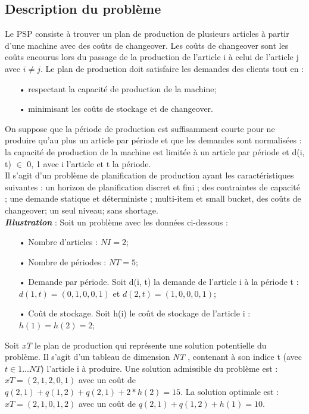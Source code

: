 \documentclass[12pt,a4paper]{article}
\begin{document}
	\subsection{Description du problème}

		\label{sec:problem_description}
		Le PSP consiste à trouver un plan de production de plusieurs articles à partir d’une machine avec des coûts de changeover. Les coûts de changeover sont les coûts encourus lors du passage de la production de l’article i à celui de l’article j avec $i \neq j$. Le plan de production doit satisfaire les demandes des clients tout en :
	\begin{itemize}
		\item[•] respectant la capacité de production de la machine;
		\item[•] minimisant les coûts de stockage et de changeover.
	\end{itemize}
	\hspace*{.5cm} On suppose que la période de production est suffisamment courte pour ne produire qu’au plus un article par période et que les demandes sont normalisées : la capacité de production de la machine est limitée à un article par
période et d(i, t) $ \in $ {0, 1} avec i l’article et t la période.\\
	\hspace*{.5cm} Il s’agit d’un problème de planification de production ayant les caractéristiques suivantes : un horizon de planification discret et fini ; des contraintes de capacité ; une demande statique et déterministe ; multi-item et small bucket, des coûts de changeover; un seul niveau; sans shortage.\\

	\textbf{\textsl{Illustration}} : Soit un problème avec les données ci-dessous : \\
	\begin{itemize}
		\item[•] Nombre d’articles : $NI = 2$;
		\item[•] Nombre de périodes : $NT = 5$;
		\item[•] Demande par période. Soit d(i, t) la demande de l’article i à la période t : $d(1, t) = (0, 1, 0, 0, 1)$ et $d(2, t) = (1, 0, 0, 0, 1)$;
		\item[•] Coût de stockage. Soit h(i) le coût de stockage de l’article i : $h(1) = h(2) = 2$;
	\end{itemize}
	Soit \emph{xT} le plan de production qui représente une solution potentielle du problème. Il s’agit d’un tableau de dimension \emph{NT} , contenant à son indice t (avec $t  \in  {1...NT}$) l’article i à produire. Une solution admissible du problème est : $ xT = (2, 1, 2, 0, 1)$ avec un coût de $ q(2, 1) + q(1, 2) + q(2, 1) + 2 * h(2) = 15 $. La solution optimale est : $ xT = (2, 1, 0, 1, 2)$ avec un coût de $q(2, 1) + q(1, 2) + h(1) = 10$.
		
\end{document}

